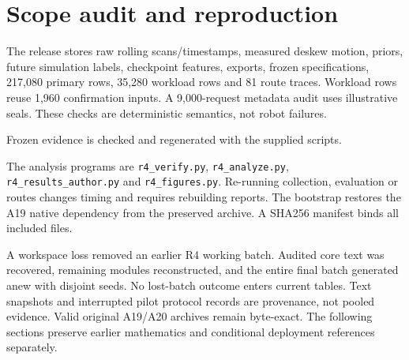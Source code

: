 
\section{Scope audit and reproduction}
The release stores raw rolling scans/timestamps, measured deskew motion, priors, future simulation labels, checkpoint features, exports, frozen specifications, 217,080 primary rows, 35,280 workload rows and 81 route traces. Workload rows reuse 1,960 confirmation inputs. A 9,000-request metadata audit uses illustrative seals. These checks are deterministic semantics, not robot failures.

Frozen evidence is checked and regenerated with the supplied scripts.\par
The analysis programs are \texttt{r4\_verify.py}, \texttt{r4\_analyze.py}, \texttt{r4\_\allowbreak results\_\allowbreak author.py} and \texttt{r4\_figures.py}. Re-running collection, evaluation or routes changes timing and requires rebuilding reports. The bootstrap restores the A19 native dependency from the preserved archive. A SHA256 manifest binds all included files.

A workspace loss removed an earlier R4 working batch. Audited core text was recovered, remaining modules reconstructed, and the entire final batch generated anew with disjoint seeds. No lost-batch outcome enters current tables. Text snapshots and interrupted pilot protocol records are provenance, not pooled evidence. Valid original A19/A20 archives remain byte-exact. The following sections preserve earlier mathematics and conditional deployment references separately.
\FloatBarrier
